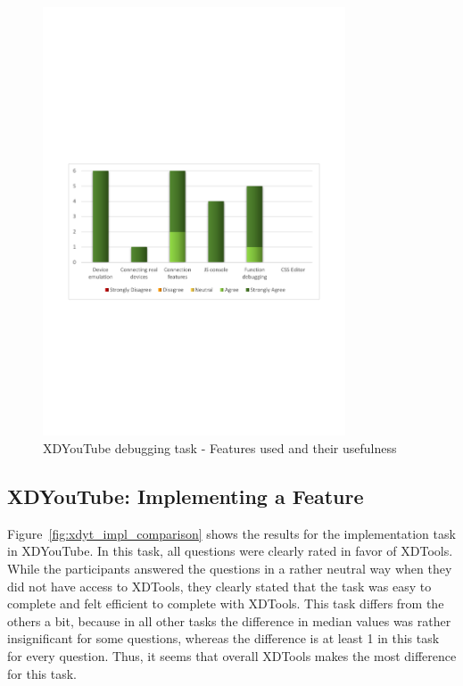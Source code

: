 \begin{figure}[H]
  \centering
    \includegraphics[width=0.8\textwidth]{images/charts/xdyt_bug_features_used.pdf}
	\caption[xdyt-bug: Features used]{XDYouTube debugging task - Features used and their usefulness}
	\label{fig:xdyt_bug_features_used}
\end{figure}

\subsection{XDYouTube: Implementing a Feature}

Figure~\ref{fig:xdyt_impl_comparison} shows the results for the implementation task in XDYouTube. In this task, all questions were clearly rated in favor of XDTools. While the participants answered the questions in a rather neutral way when they did not have access to XDTools, they clearly stated that the task was easy to complete and felt efficient to complete with XDTools. This task differs from the others a bit, because in all other tasks the difference in median values was rather insignificant for some questions, whereas the difference is at least 1 in this task for every question. Thus, it seems that overall XDTools makes the most difference for this task.

